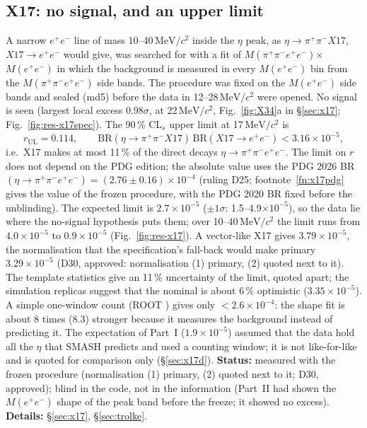 \documentclass[11pt,a4paper]{article}
\newcommand{\ee}{\ensuremath{e^{+}e^{-}}\xspace}
\newcommand{\pipi}{\ensuremath{\pi^{+}\pi^{-}}\xspace}
\newcommand{\ppee}{\ensuremath{\pi^{+}\pi^{-}e^{+}e^{-}}\xspace}
\newcommand{\Mfour}{\ensuremath{M(\pi^{+}\pi^{-}e^{+}e^{-})}\xspace}
\newcommand{\Mee}{\ensuremath{M(e^{+}e^{-})}\xspace}
\newcommand{\MeVcc}{\ensuremath{\mathrm{MeV}/c^{2}}\xspace}
\newcommand{\code}[1]{\texttt{\detokenize{#1}}}
\newcommand{\BRX}{\ensuremath{\mathrm{BR}(\eta\to\pipi X17)\,\mathrm{BR}(X17\to\ee)}\xspace}
\begin{document}
\subsection{X17: no signal, and an upper limit}
\label{sec:res-x17}
A narrow \ee line of mass 10--40\,\MeVcc inside the $\eta$ peak, as $\eta\to\pipi X17$, $X17\to\ee$ would give, was searched for with a fit of
\Mfour$\times$\Mee in which the background is measured in every \Mee bin from the \Mfour side bands. The procedure was fixed on the \Mee side
bands and sealed (md5) before the data in 12--28\,\MeVcc were opened. No signal is seen (largest local excess $0.98\sigma$, at 22\,\MeVcc, Fig.~\ref{fig:X34}a in \S\ref{sec:x17};
Fig.~\ref{fig:res-x17spec}). The
90\,\% CL$_s$ upper limit at 17\,\MeVcc is
\[ r_{\mathrm{UL}}=0.114,\qquad \BRX<3.16\times10^{-5}, \]
i.e.\ X17 makes at most 11\,\% of the direct decays $\eta\to\ppee$. The limit on $r$ does not depend on the PDG edition; the absolute value
uses the PDG 2026 BR$(\eta\to\ppee)=(2.76\pm0.16)\times10^{-4}$ (ruling D25; footnote~\ref{fn:x17pdg} gives the value of the frozen
procedure, with the PDG 2020 BR fixed before the unblinding). The expected limit is $2.7\times10^{-5}$ ($\pm1\sigma$: 1.5--4.9$\times10^{-5}$), so the data lie where
the no-signal hypothesis puts them; over 10--40\,\MeVcc the limit runs from $4.0\times10^{-5}$ to $0.9\times10^{-5}$ (Fig.~\ref{fig:res-x17}). A
vector-like X17 gives $3.79\times10^{-5}$, the normalisation that the specification's fall-back would make primary $3.29\times10^{-5}$ (D30,
approved: normalisation (1) primary, (2) quoted next to it). The template statistics give an 11\,\% uncertainty of the limit, quoted apart; the simulation replicas suggest that the
nominal is about 6\,\% optimistic ($3.35\times10^{-5}$). A simple one-window count (ROOT \code{TRolke}) gives only $<2.6\times10^{-4}$: the shape
fit is about 8 times (8.3) stronger because it measures the background instead of predicting it.
The expectation of Part~I ($1.9\times10^{-5}$) assumed that the data hold all the $\eta$ that SMASH predicts and used a counting
window; it is not like-for-like and is quoted for comparison only (\S\ref{sec:x17d}).
\textbf{Status:} measured with the frozen procedure (normalisation (1) primary, (2) quoted next to it; D30, approved); blind in the code, not in the
information (Part~II had shown the \Mee shape of the peak band before the freeze; it showed no excess). \textbf{Details:} \S\ref{sec:x17},
\S\ref{sec:trolke}.
\end{document}
